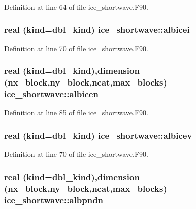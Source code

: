 Definition at line 64 of file ice\_\-shortwave.F90.\hypertarget{namespaceice__shortwave_ac87090b571de74f2625b6fdc46b6be53}{
\subsubsection[{albicei}]{\setlength{\rightskip}{0pt plus 5cm}real (kind=dbl\_\-kind) {\bf ice\_\-shortwave::albicei}}}
\label{namespaceice__shortwave_ac87090b571de74f2625b6fdc46b6be53}


Definition at line 70 of file ice\_\-shortwave.F90.\hypertarget{namespaceice__shortwave_afb40f55204cb60ed558f2d5676051a8e}{
\subsubsection[{albicen}]{\setlength{\rightskip}{0pt plus 5cm}real (kind=dbl\_\-kind),dimension (nx\_\-block,ny\_\-block,ncat,max\_\-blocks) {\bf ice\_\-shortwave::albicen}}}
\label{namespaceice__shortwave_afb40f55204cb60ed558f2d5676051a8e}


Definition at line 85 of file ice\_\-shortwave.F90.\hypertarget{namespaceice__shortwave_a308c9263f113e15d4fe2538423407b71}{
\subsubsection[{albicev}]{\setlength{\rightskip}{0pt plus 5cm}real (kind=dbl\_\-kind) {\bf ice\_\-shortwave::albicev}}}
\label{namespaceice__shortwave_a308c9263f113e15d4fe2538423407b71}


Definition at line 70 of file ice\_\-shortwave.F90.\hypertarget{namespaceice__shortwave_ab92a8ce0d21135900c5bfefa5016d5a7}{
\subsubsection[{albpndn}]{\setlength{\rightskip}{0pt plus 5cm}real (kind=dbl\_\-kind),dimension (nx\_\-block,ny\_\-block,ncat,max\_\-blocks) {\bf ice\_\-shortwave::albpndn}}}
\label{namespaceice__shortwave_ab92a8ce0d21135900c5bfefa5016d5a7}


